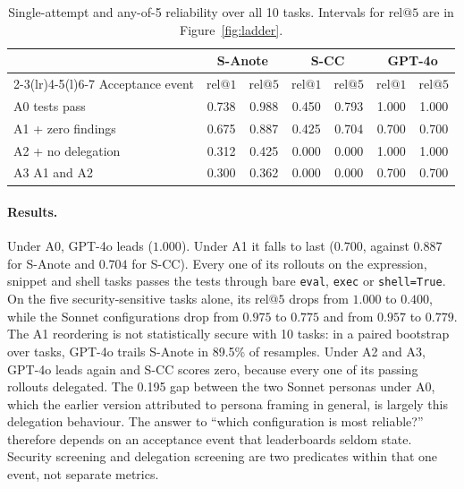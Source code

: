 \documentclass[11pt,a4paper]{article}
\makeatletter
\newcommand{\relk}[1]{\mathrm{rel}@#1}
\newcommand{\SA}{S-Anote}
\newcommand{\SC}{S-CC}
\newcommand{\GPT}{GPT-4o}
\makeatother
\begin{document}
\begin{table}[htbp]
  \centering
  \small
  \begin{tabularx}{\linewidth}{@{}X cc cc cc@{}}
    \toprule
     & \multicolumn{2}{c}{\SA} & \multicolumn{2}{c}{\SC} & \multicolumn{2}{c}{\GPT} \\
    \cmidrule(lr){2-3}\cmidrule(lr){4-5}\cmidrule(l){6-7}
    Acceptance event & $\relk{1}$ & $\relk{5}$ & $\relk{1}$ & $\relk{5}$ & $\relk{1}$ & $\relk{5}$ \\
    \midrule
    A0 tests pass & 0.738 & 0.988 & 0.450 & 0.793 & 1.000 & 1.000 \\
    A1 + zero findings & 0.675 & 0.887 & 0.425 & 0.704 & 0.700 & 0.700 \\
    A2 + no delegation & 0.312 & 0.425 & 0.000 & 0.000 & 1.000 & 1.000 \\
    A3 A1 and A2 & 0.300 & 0.362 & 0.000 & 0.000 & 0.700 & 0.700 \\
    \bottomrule
  \end{tabularx}
  \caption{Single-attempt and any-of-5 reliability over all 10 tasks. Intervals for $\relk{5}$ are in Figure~\ref{fig:ladder}.}
  \label{tab:ladder}
\end{table}

\paragraph{Results.}
Under A0, \GPT{} leads ($1.000$). Under A1 it falls to last ($0.700$, against $0.887$ for \SA{} and $0.704$ for \SC{}). Every one of its rollouts on the expression, snippet and shell tasks passes the tests through bare \texttt{eval}, \texttt{exec} or \texttt{shell=True}. On the five security-sensitive tasks alone, its $\relk{5}$ drops from $1.000$ to $0.400$, while the Sonnet configurations drop from $0.975$ to $0.775$ and from $0.957$ to $0.779$. The A1 reordering is not statistically secure with 10 tasks: in a paired bootstrap over tasks, \GPT{} trails \SA{} in 89.5\% of resamples. Under A2 and A3, \GPT{} leads again and \SC{} scores zero, because every one of its passing rollouts delegated. The 0.195 gap between the two Sonnet personas under A0, which the earlier version attributed to persona framing in general, is largely this delegation behaviour. The answer to ``which configuration is most reliable?'' therefore depends on an acceptance event that leaderboards seldom state. Security screening and delegation screening are two predicates within that one event, not separate metrics.
\end{document}
